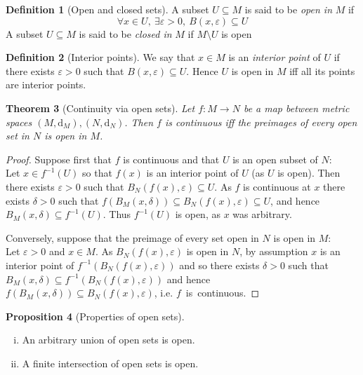 \documentclass[10pt,fleqn]{article}
\newcommand{\met}{\mathrm{d}}
\newcommand{\eps}{\varepsilon}
\theoremstyle{definition} \newtheorem{defn}{Definition}[section]
\theoremstyle{plain}      \newtheorem{thm}[defn]{Theorem}
\theoremstyle{definition} \newtheorem{prop}[defn]{Proposition}
\theoremstyle{definition} \newtheorem{cor}[defn]{Corollary}
\theoremstyle{definition} \newtheorem{ex}[defn]{Example}
\theoremstyle{definition} \newtheorem{rem}[defn]{Remark}
\begin{document}
\begin{defn}[Open and closed sets]
    A subset $U\subseteq M$ is said to be \emph{open in} $M$ if
    \[
        \forall x\in U,~
        \exists\eps>0,~
        B(x,\eps)\subseteq U
    \]
    A subset $U\subseteq M$ is said to be \emph{closed in} $M$ if $M\setminus U$ is open
\end{defn}

\begin{defn}[Interior points]
    We say that $x\in M$ is an \emph{interior point} of $U$ if there exists $\eps>0$ such that $B(x,\eps)\subseteq U$.
    Hence $U$ is open in $M$ iff all its points are interior points.
\end{defn}

\begin{thm}[Continuity via open sets]\label{open-set-continuity}
    Let $f:M\to N$ be a map between metric spaces $(M,\met_M),(N,\met_N)$.
    Then $f$ is continuous iff the preimages of every open set in $N$ is open in $M$.
\end{thm}

\begin{proof}
    Suppose first that $f$ is continuous and that $U$ is an open subset of $N$:\\
    Let $x\in f^{-1}(U)$ so that $f(x)$ is an interior point of $U$ (as $U$ is open).
    Then there exists $\eps>0$ such that $B_N(f(x),\eps)\subseteq U$.
    As $f$ is continuous at $x$ there exists $\delta>0$ such that $f(B_M(x,\delta)) \subseteq B_N(f(x),\eps) \subseteq U$, and hence $B_M(x,\delta)\subseteq f^{-1}(U)$.
    Thus $f^{-1}(U)$ is open, as $x$ was arbitrary.

    Conversely, suppose that the preimage of every set open in $N$ is open in $M$:\\
    Let $\eps>0$ and $x\in M$.
    As $B_N(f(x),\eps)$ is open in $N$, by assumption $x$ is an interior point of $f^{-1}(B_N(f(x),\eps))$ and so there exists $\delta>0$ such that $B_M(x,\delta)\subseteq f^{-1}(B_N(f(x),\eps))$ and hence $f(B_M(x,\delta))\subseteq B_N(f(x),\eps)$, i.e. \mbox{$f$ is continuous}.
\end{proof}

\begin{prop}[Properties of open sets]\label{open-set-properties}
    \begin{enumerate}[(i)]
        \item An arbitrary union of open sets is open.
        \item A finite intersection of open sets is open.
    \end{enumerate}
\end{prop}
\end{document}
